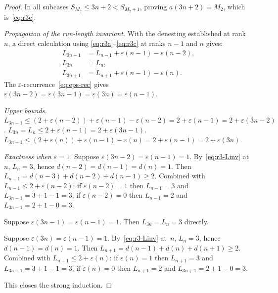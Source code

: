 \documentclass[10pt,a4paper]{amsart}
\begin{document}
\begin{proof}
In all subcases $S_{M_2}\le 3n+2<S_{M_2+1}$,
proving $a(3n+2)=M_2$, which is~\eqref{eq:r3c}.

\textit{Propagation of the run-length invariant.}
With the denesting established at rank~$n$, a direct calculation
using \eqref{eq:r3a}--\eqref{eq:r3c} at ranks $n-1$ and $n$ gives:
\begin{align}
  L_{3n-1} &= L_{n-1}+\varepsilon(n-1)-\varepsilon(n-2),\label{eq:Lprop1}\\
  L_{3n}   &= L_n,                                       \label{eq:Lprop2}\\
  L_{3n+1} &= L_{n+1}+\varepsilon(n-1)-\varepsilon(n).   \label{eq:Lprop3}
\end{align}
The $\varepsilon$-recurrence~\eqref{eq:eps-rec} gives
$\varepsilon(3n-2)=\varepsilon(3n-1)=\varepsilon(3n)=\varepsilon(n-1)$.

\emph{Upper bounds.}
$L_{3n-1}\le(2+\varepsilon(n-2))+\varepsilon(n-1)-\varepsilon(n-2)=2+\varepsilon(n-1)=2+\varepsilon(3n-2)$.
$L_{3n}=L_n\le 2+\varepsilon(n-1)=2+\varepsilon(3n-1)$.
$L_{3n+1}\le(2+\varepsilon(n))+\varepsilon(n-1)-\varepsilon(n)=2+\varepsilon(n-1)=2+\varepsilon(3n)$.

\emph{Exactness when $\varepsilon=1$.}
Suppose $\varepsilon(3n-2)=\varepsilon(n-1)=1$.
By~\eqref{eq:r3-Linv} at~$n$, $L_n=3$, hence $d(n-2)=d(n-1)=d(n)=1$.
Then $L_{n-1}=d(n-3)+d(n-2)+d(n-1)\ge 2$.
Combined with $L_{n-1}\le 2+\varepsilon(n-2)$:
if $\varepsilon(n-2)=1$ then $L_{n-1}=3$ and $L_{3n-1}=3+1-1=3$;
if $\varepsilon(n-2)=0$ then $L_{n-1}=2$ and $L_{3n-1}=2+1-0=3$.

Suppose $\varepsilon(3n-1)=\varepsilon(n-1)=1$.
Then $L_{3n}=L_n=3$ directly.

Suppose $\varepsilon(3n)=\varepsilon(n-1)=1$.
By~\eqref{eq:r3-Linv} at~$n$, $L_n=3$, hence $d(n-1)=d(n)=1$.
Then $L_{n+1}=d(n-1)+d(n)+d(n+1)\ge 2$.
Combined with $L_{n+1}\le 2+\varepsilon(n)$:
if $\varepsilon(n)=1$ then $L_{n+1}=3$ and $L_{3n+1}=3+1-1=3$;
if $\varepsilon(n)=0$ then $L_{n+1}=2$ and $L_{3n+1}=2+1-0=3$.

This closes the strong induction.
\end{proof}
\end{document}
